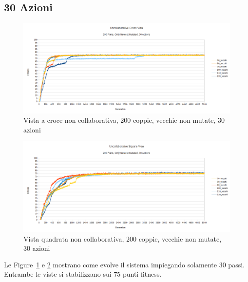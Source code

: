 \subsection{30 Azioni}
\begin{figure}[ht]
	\centering
	\includegraphics[scale=0.7,angle=90]{imgs/cross_nc_200_pairs_70_120_old_not_mutated_30_actions.png}
	\caption{Vista a croce non collaborativa, 200 coppie, vecchie non mutate, 30 azioni}
	\label{figure:cross_nc_200_70_120_non_30_actions}
\end{figure}
\begin{figure}[ht]
	\centering
	\includegraphics[scale=0.7,angle=90]{imgs/square_nc_200_pairs_70_120_old_not_mutated_30_actions.png}
	\caption{Vista quadrata non collaborativa, 200 coppie, vecchie non mutate, 30 azioni}
	\label{figure:square_nc_200_70_120_non_30_actions}
\end{figure}
Le Figure~\ref{figure:cross_nc_200_70_120_non_30_actions} e
\ref{figure:square_nc_200_70_120_non_30_actions} mostrano come evolve il sistema
impiegando solamente 30 passi. Entrambe le viste si stabilizzano sui 75 punti
fitness.
